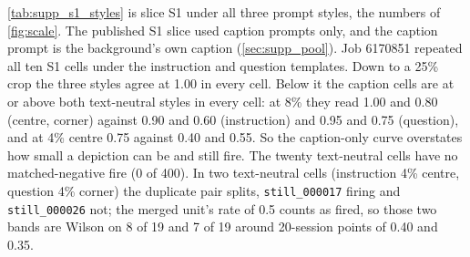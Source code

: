 \cref{tab:supp_s1_styles} is slice S1 under all three prompt styles, the numbers of
\cref{fig:scale}. The published S1 slice used caption prompts only, and the
caption prompt is the background's own caption (\cref{sec:supp_pool}). Job
6170851 repeated all ten S1 cells under the instruction and question templates.
Down to a 25\% crop the three styles agree at 1.00 in
every cell. Below it the caption cells are at or above both text-neutral styles in every cell: at 8\% they
read 1.00 and 0.80 (centre, corner) against 0.90 and 0.60 (instruction) and 0.95
and 0.75 (question), and at 4\% centre 0.75 against 0.40 and 0.55. So the
caption-only curve overstates how small a depiction can be and still fire. The
twenty text-neutral cells have no matched-negative fire (0 of 400).
In two text-neutral cells (instruction 4\% centre, question 4\% corner) the duplicate pair
splits, \texttt{still\_000017} firing and \texttt{still\_000026} not; the merged unit's rate
of 0.5 counts as fired, so those two bands are Wilson on 8 of 19 and 7 of 19 around 20-session
points of 0.40 and 0.35.
\SuppSOneStylesTable

